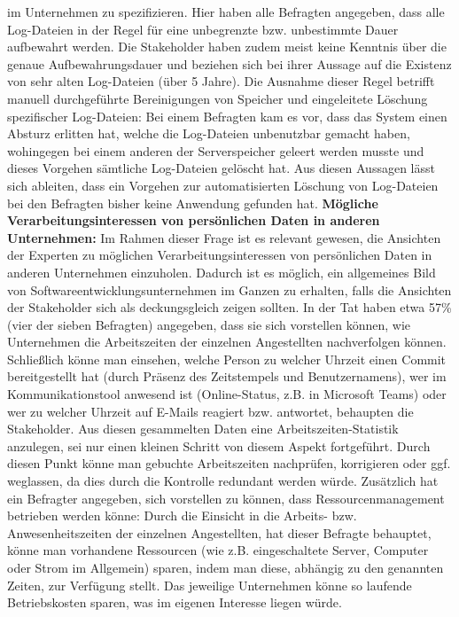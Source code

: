 im Unternehmen zu spezifizieren. Hier haben alle Befragten angegeben, dass alle Log-Dateien in der Regel für eine unbegrenzte bzw. unbestimmte Dauer aufbewahrt werden. Die Stakeholder haben zudem meist keine Kenntnis über die genaue Aufbewahrungsdauer und 
beziehen sich bei ihrer Aussage auf die Existenz von sehr alten Log-Dateien (über 5 Jahre). Die Ausnahme dieser Regel betrifft manuell durchgeführte Bereinigungen von Speicher und eingeleitete Löschung spezifischer Log-Dateien: Bei einem Befragten kam es vor,
dass das System einen Absturz erlitten hat, welche die Log-Dateien unbenutzbar gemacht haben, wohingegen bei einem anderen der Serverspeicher geleert werden musste und dieses Vorgehen sämtliche Log-Dateien gelöscht hat. \newline Aus diesen Aussagen lässt sich 
ableiten, dass ein Vorgehen zur automatisierten Löschung von Log-Dateien bei den Befragten bisher keine Anwendung gefunden hat. \newline \newline
\textbf{Mögliche Verarbeitungsinteressen von persönlichen Daten in anderen Unternehmen:} \newline
Im Rahmen dieser Frage ist es relevant gewesen, die Ansichten der Experten zu möglichen Verarbeitungsinteressen von persönlichen Daten in anderen Unternehmen einzuholen. Dadurch ist es möglich, ein allgemeines Bild von Softwareentwicklungsunternehmen im Ganzen zu erhalten, falls die Ansichten der Stakeholder sich als deckungsgleich zeigen sollten. In der Tat haben etwa 57\% (vier der sieben Befragten) angegeben,
dass sie sich vorstellen können, wie Unternehmen die Arbeitszeiten der einzelnen Angestellten nachverfolgen können. Schließlich könne man einsehen, welche Person zu welcher Uhrzeit einen Commit bereitgestellt hat (durch Präsenz des Zeitstempels und Benutzernamens), wer im Kommunikationstool anwesend ist (Online-Status, z.B. in Microsoft Teams) oder wer zu welcher Uhrzeit auf E-Mails reagiert bzw. antwortet, behaupten die Stakeholder.
Aus diesen gesammelten Daten eine Arbeitszeiten-Statistik anzulegen, sei nur einen kleinen Schritt von diesem Aspekt fortgeführt. Durch diesen Punkt könne man gebuchte Arbeitszeiten nachprüfen, korrigieren oder ggf. weglassen, da dies durch die Kontrolle redundant werden würde. \newline
Zusätzlich hat ein Befragter angegeben, sich vorstellen zu können, dass Ressourcenmanagement betrieben werden könne: Durch die Einsicht in die Arbeits- bzw. Anwesenheitszeiten der einzelnen Angestellten, hat dieser Befragte behauptet, könne man vorhandene Ressourcen (wie z.B. eingeschaltete Server, Computer oder Strom im Allgemein) sparen, indem man diese, abhängig zu den genannten Zeiten, zur Verfügung stellt. Das jeweilige Unternehmen
könne so laufende Betriebskosten sparen, was im eigenen Interesse liegen würde.

